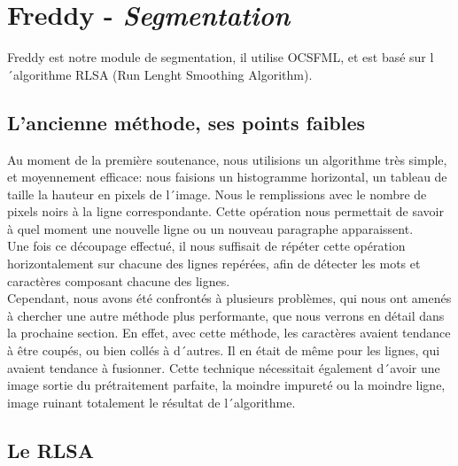 \chapter{Freddy - \emph{Segmentation}}

Freddy est notre module de segmentation, il utilise OCSFML, et est basé sur l´algorithme RLSA (Run Lenght Smoothing Algorithm).

\section{L'ancienne méthode, ses points faibles}

Au moment de la première soutenance, nous utilisions un algorithme très simple, et moyennement efficace: nous faisions un histogramme horizontal, un tableau de taille la hauteur en pixels de l´image. Nous le remplissions avec le nombre de pixels noirs à la ligne correspondante. Cette opération nous permettait de savoir à quel moment une nouvelle ligne ou un nouveau paragraphe apparaissent.\\
Une fois ce découpage effectué, il nous suffisait de répéter cette opération horizontalement sur chacune des lignes repérées, afin de détecter les mots et caractères composant chacune des lignes.\\
Cependant, nous avons été confrontés à plusieurs problèmes, qui nous ont amenés à chercher une autre méthode plus performante, que nous verrons en détail dans la prochaine section. En effet, avec cette méthode, les caractères avaient tendance à être coupés, ou bien collés à d´autres. Il en était de même pour les lignes, qui avaient tendance à fusionner. Cette technique nécessitait également d´avoir une image sortie du prétraitement parfaite, la moindre impureté ou la moindre ligne, image ruinant totalement le résultat de l´algorithme.


\section{Le RLSA}

